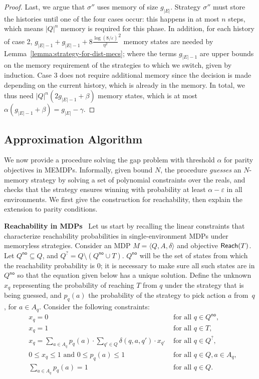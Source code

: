 \documentclass[a4paper,USenglish,cleveref, autoref, thm-restate]{lipics-v2021}
\let\epsilon\varepsilon
\def\abs#1{\ensuremath{\lvert #1 \rvert}}
\def\myparagraph#1{\noindent\textbf{#1}~}
\newcommand{\tuple}[1]{\langle #1 \rangle}
\newcommand\Reach{\textrm{\sf Reach}}
\begin{document}
\begin{proof}
  Last, we argue that $\sigma''$ uses memory of size $g_{\abs{E}}$. 
  Strategy $\sigma''$ must store the histories until one of the four cases occur: this happens in at most $n$ steps, which means $\abs{Q}^{n}$ memory is required for this phase.
  In addition, for each history of case 2, $g_{\abs{E}-1} + g_{\abs{E}-1} + 8\frac{\log(8/\epsilon)}{\eta^2}^2$ memory states are needed by Lemma~\ref{lemma:strategy-for-dist-mecs};
  where the terms $g_{\abs{E}-1}$ are upper bounds on the memory requirement of the strategies to which
  we switch, given by induction.
  Case 3 does not require additional memory since the decision is made depending on the current history, which is already in the memory. In total, we thus need
  $\abs{Q}^n(2g_{\abs{E}-1} + \beta)$ memory states, which is at most $\alpha(g_{\abs{E}-1} + \beta) =
  g_{\abs{E}}-\gamma$.
\end{proof}

\subsection{Approximation Algorithm}\label{sec:approx_alg}

We now provide a procedure solving the gap problem with threshold $\alpha$ for parity objectives in MEMDPs.
Informally, given bound $N$, the procedure \emph{guesses} an $N$-memory strategy by solving 
a set of polynomial constraints over the reals,
and checks that the strategy ensures winning with probability at least $\alpha - \epsilon$
in all environments.
We first give the construction for reachability, then explain the extension to parity conditions.

\smallskip
\myparagraph{Reachability in MDPs}
\def\Qno{Q^{\textsf{no}}}
\def\Qquestion{Q^{?}}
Let us start by recalling the linear constraints that characterize 
reachability probabilities in single-environment MDPs under memoryless strategies.
Consider an MDP $M=\tuple{Q,A,\delta}$ and objective $\Reach(T)$.
Let $\Qno \subseteq Q$, and $\Qquestion = Q\setminus (\Qno \cup T)$.
$\Qno$ will be the set of states from which the reachability probability is $0$; it is necessary to make sure all such states are in $\Qno$ 
so that the equation given below has a unique solution.
Define the unknown $x_q$ representing the probability of reaching $T$ from $q$ under the strategy that is being guessed,
and $p_{q}(a)$ the probability of the strategy to pick action $a$ from~$q$, for $a \in A_q$.
Consider the following constraints:
\begin{equation}
  \label{eqn:mdp-reach}
  \!\!\!\!\begin{array}{lll}
    &x_q = 0 & \text{ for all } q \in \Qno, \\
    &x_q = 1 & \text{ for all } q\in T, \\   
    &x_q = \sum_{a \in A_q} p_{q}(a) \cdot \sum_{q' \in Q} \delta(q,a,q') \cdot x_{q'} & \text{ for all } q \in \Qquestion,\\
    &0 \leq x_q \leq 1 \text{ and } 0 \leq p_{q}(a) \leq 1 & \text{ for all } q \in Q, a \in A_q,\\
    &\sum_{a \in A_q} p_{q}(a) =1 & \text{ for all } q \in Q.
  \end{array}
\end{equation}
\end{document}
